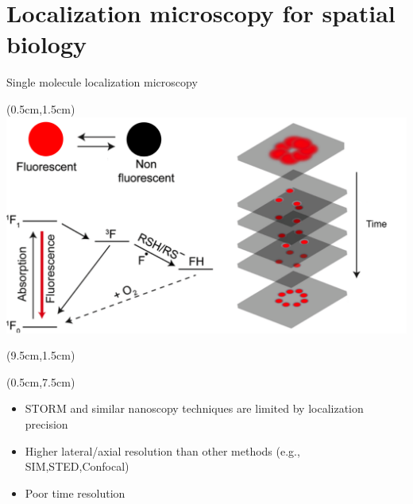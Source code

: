 \documentclass{beamer}					%
\begin{document}
\section{Localization microscopy for spatial biology}


\begin{frame}{Single molecule localization microscopy}
\begin{textblock*}{9cm}(0.5cm,1.5cm)
\includegraphics[width=\textwidth]{../../phd/dissertation/dissertation/media/Intro-Cropped.png}
\end{textblock*}
\begin{textblock*}{5cm}(9.5cm,1.5cm)
\end{textblock*}
\begin{textblock*}{15cm}(0.5cm,7.5cm)
\begin{itemize}
\item STORM and similar nanoscopy techniques are limited by localization precision
\item Higher lateral/axial resolution than other methods (e.g., SIM,STED,Confocal)
\item Poor time resolution
\end{itemize}
\end{textblock*}
\end{frame}
\end{document}
